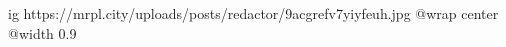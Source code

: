  
 
 
 
 

\ifcmt
  ig https://mrpl.city/uploads/posts/redactor/9acgrefv7yiyfeuh.jpg
  @wrap center
  @width 0.9
\fi
